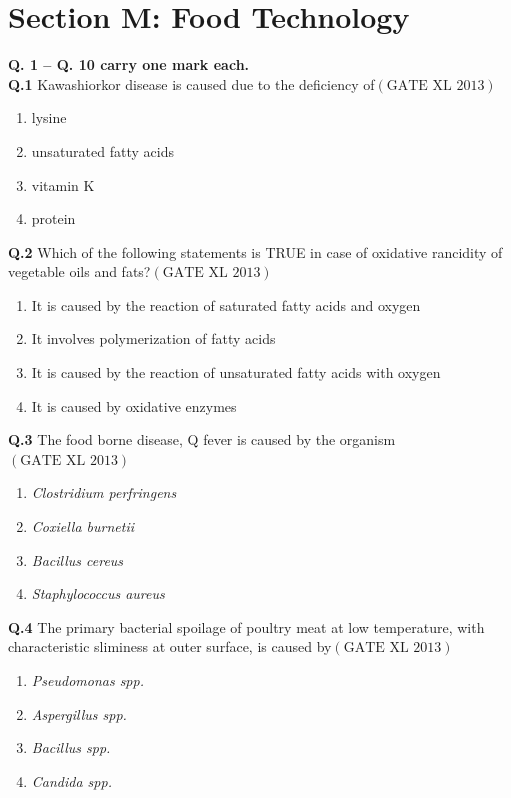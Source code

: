 \documentclass[12pt]{article}
\theoremstyle{remark}
\providecommand{\brak}[1]{\ensuremath{\left(#1\right)}}
\begin{document}
\clearpage
\section*{Section M: Food Technology}

\noindent\textbf{Q. 1 – Q. 10 carry one mark each.}\\

\textbf{Q.1} Kawashiorkor disease is caused due to the deficiency of\hfill $\brak{\text{GATE XL 2013}}$
\begin{enumerate}
    \item lysine
    \item unsaturated fatty acids
    \item vitamin K
    \item protein
\end{enumerate}

\textbf{Q.2} Which of the following statements is TRUE in case of oxidative rancidity of vegetable oils and fats?\hfill $\brak{\text{GATE XL 2013}}$
\begin{enumerate}
    \item It is caused by the reaction of saturated fatty acids and oxygen
    \item It involves polymerization of fatty acids
    \item It is caused by the reaction of unsaturated fatty acids with oxygen
    \item It is caused by oxidative enzymes
\end{enumerate}

\textbf{Q.3} The food borne disease, Q fever is caused by the organism\hfill $\brak{\text{GATE XL 2013}}$
\begin{enumerate}
    \item \textit{Clostridium perfringens}
    \item \textit{Coxiella burnetii}
    \item \textit{Bacillus cereus}
    \item \textit{Staphylococcus aureus}
\end{enumerate}

\textbf{Q.4} The primary bacterial spoilage of poultry meat at low temperature, with characteristic sliminess at outer surface, is caused by\hfill $\brak{\text{GATE XL 2013}}$
\begin{enumerate}
    \item \textit{Pseudomonas spp.}
    \item \textit{Aspergillus spp.}
    \item \textit{Bacillus spp.}
    \item \textit{Candida spp.}
\end{enumerate}
\end{document}
